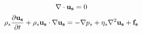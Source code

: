 \begin{equation}\label{eq:conti}
    \nabla \cdot \bold{u_{s}} = 0
\end{equation}
\begin{equation}\label{eq:ns_incom newton}
    \rho_s \frac{\partial \bold{u_s}}{\partial t} + \rho_s \bold{u_s} \cdot \nabla \bold{u_s} = -\nabla p_s + \eta_s \nabla^2 \bold{u_s} + \bold{f_s}
\end{equation}








